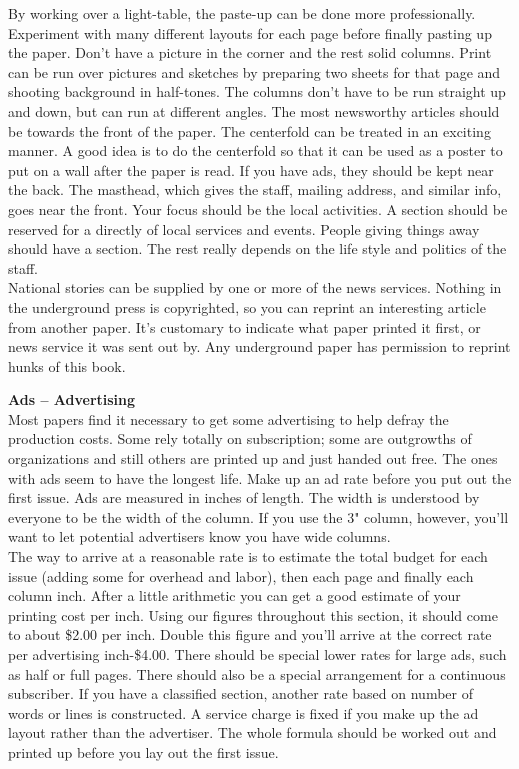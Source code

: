 \documentclass[11pt,twoside,a4paper]{book}
\begin{document}
By working over a light-table, the paste-up can be done more professionally. Experiment with many different layouts for each page before finally pasting up the paper. Don't have a picture in the corner and the rest solid columns. Print can be run over pictures and sketches by preparing two sheets for that page and shooting background in half-tones. The columns don't have to be run straight up and down, but can run at different angles. The most newsworthy articles should be towards the front of the paper.  The centerfold can be treated in an exciting manner. A good idea is to do the centerfold so that it can be used as a poster to put on a wall after the paper is read. If you have ads, they should be kept near the back. The masthead, which gives the staff, mailing address, and similar info, goes near the front. Your focus should be the local activities. A section should be reserved for a directly of local services and events. People giving things away should have a section. The rest really depends on the life style and politics of the staff.~\\

National stories can be supplied by one or more of the news services. Nothing in the underground press is copyrighted, so you can reprint an interesting article from another paper. It's customary to indicate what paper printed it first, or news service it was sent out by. Any underground paper has permission to reprint hunks of this book.~\\

\clearpage

\textbf{Ads -- Advertising}~\\
Most papers find it necessary to get some advertising to help defray the production costs. Some rely totally on subscription; some are outgrowths of organizations and still others are printed up and just handed out free. The ones with ads seem to have the longest life. Make up an ad rate before you put out the first issue. Ads are measured in inches of length. The width is understood by everyone to be the width of the column. If you use the 3" column, however, you'll want to let potential advertisers know you have wide columns.~\\

The way to arrive at a reasonable rate is to estimate the total budget for each issue (adding some for overhead and labor), then each page and finally each column inch. After a little arithmetic you can get a good estimate of your printing cost per inch. Using our figures throughout this section, it should come to about \$2.00 per inch. Double this figure and you'll arrive at  the correct rate per advertising inch-\$4.00. There should be special lower rates for large ads, such as half or full pages. There should also be a special arrangement for a continuous subscriber. If you have a classified section, another rate based on number of words or lines is constructed. A service charge is fixed if you make up the ad layout rather than the advertiser. The whole formula should be worked out and printed up before you lay out the first issue.~\\
\end{document}
